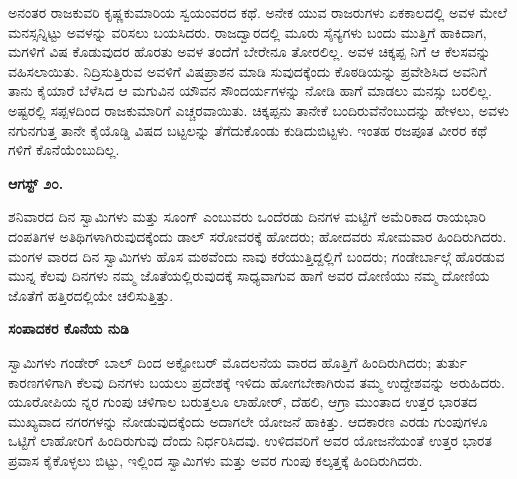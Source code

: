 ಅನಂತರ ರಾಜಕುವರಿ ಕೃಷ್ಣಕುಮಾರಿಯ ಸ್ವಯಂವರದ ಕಥೆ. ಅನೇಕ ಯುವ ರಾಜರುಗಳು ಏಕಕಾಲದಲ್ಲಿ ಅವಳ ಮೇಲೆ ಮನಸ್ಸನ್ನಿಟ್ಟು ಅವಳನ್ನು ವರಿಸಲು ಬಯಸಿದರು. ರಾಜದ್ವಾರದಲ್ಲಿ ಮೂರು ಸೈನ್ಯಗಳು ಬಂದು ಮುತ್ತಿಗೆ ಹಾಕಿದಾಗ, ಮಗಳಿಗೆ ವಿಷ ಕೊಡುವುದರ ಹೊರತು ಅವಳ ತಂದೆಗೆ ಬೇರೇನೂ ತೋರಲಿಲ್ಲ. ಅವಳ ಚಿಕ್ಕಪ್ಪ ನಿಗೆ ಆ ಕೆಲಸವನ್ನು ವಹಿಸಲಾಯಿತು. ನಿದ್ರಿಸುತ್ತಿರುವ ಅವಳಿಗೆ ವಿಷಪ್ರಾಶನ ಮಾಡಿ ಸುವುದಕ್ಕೆಂದು ಕೊಠಡಿಯನ್ನು ಪ್ರವೇಶಿಸಿದ ಅವನಿಗೆ ತಾನು ಕೈಯಾರೆ ಬೆಳೆಸಿದ ಆ ಮಗುವಿನ ಯೌವನ ಸೌಂದರ್ಯಗಳನ್ನು ನೋಡಿ ಹಾಗೆ ಮಾಡಲು ಮನಸ್ಸು ಬರಲಿಲ್ಲ. ಅಷ್ಟರಲ್ಲಿ ಸಪ್ಪಳದಿಂದ ರಾಜಕುಮಾರಿಗೆ ಎಚ್ಚರವಾಯಿತು. ಚಿಕ್ಕಪ್ಪನು ತಾನೇಕೆ ಬಂದಿರುವೆನೆಂಬುದನ್ನು ಹೇಳಲು, ಅವಳು ನಗುನಗುತ್ತ ತಾನೇ ಕೈಯೊಡ್ಡಿ ವಿಷದ ಬಟ್ಟಲನ್ನು ತೆಗೆದುಕೊಂಡು ಕುಡಿದುಬಿಟ್ಟಳು. ಇಂತಹ ರಜಪೂತ ವೀರರ ಕಥೆ ಗಳಿಗೆ ಕೊನೆಯೆಂಬುದಿಲ್ಲ.

\textbf{ಆಗಸ್ಟ್ ೨೦.}

ಶನಿವಾರದ ದಿನ ಸ್ವಾಮಿಗಳು ಮತ್ತು ಸೂಂಗ್ ಎಂಬುವರು ಒಂದೆರಡು ದಿನಗಳ ಮಟ್ಟಿಗೆ ಅಮೆರಿಕಾದ ರಾಯಭಾರಿ ದಂಪತಿಗಳ ಅತಿಥಿಗಳಾಗಿರುವುದಕ್ಕೆಂದು ಡಾಲ್ ಸರೋವರಕ್ಕೆ ಹೋದರು; ಹೋದವರು ಸೋಮವಾರ ಹಿಂದಿರುಗಿದರು. ಮಂಗಳ ವಾರದ ದಿನ ಸ್ವಾಮಿಗಳು ಹೊಸ ಮಠವೆಂದು ನಾವು ಕರೆಯುತ್ತಿದ್ದಲ್ಲಿಗೆ ಬಂದರು; ಗಂಡೇರ್ಬಾಲ್ಗೆ ಹೊರಡುವ ಮುನ್ನ ಕೆಲವು ದಿನಗಳು ನಮ್ಮ ಜೊತೆಯಲ್ಲಿರುವುದಕ್ಕೆ ಸಾಧ್ಯವಾಗುವ ಹಾಗೆ ಅವರ ದೋಣಿಯು ನಮ್ಮ ದೋಣಿಯ ಜೊತೆಗೆ ಹತ್ತಿರದಲ್ಲಿಯೇ ಚಲಿಸುತ್ತಿತ್ತು.

\begin{center}
\textbf{ಸಂಪಾದಕರ ಕೊನೆಯ ನುಡಿ}
\end{center}

ಸ್ವಾಮಿಗಳು ಗಂಡೇರ್ ಬಾಲ್ ದಿಂದ ಅಕ್ಟೋಬರ್ ಮೊದಲನೆಯ ವಾರದ ಹೊತ್ತಿಗೆ ಹಿಂದಿರುಗಿದರು; ತುರ್ತು ಕಾರಣಗಳಿಗಾಗಿ ಕೆಲವು ದಿನಗಳು ಬಯಲು ಪ್ರದೇಶಕ್ಕೆ ಇಳಿದು ಹೋಗಬೇಕಾಗಿರುವ ತಮ್ಮ ಉದ್ದೇಶವನ್ನು ಅರುಹಿದರು. ಯೂರೋಪಿಯ ನ್ನರ ಗುಂಪು ಚಳಿಗಾಲ ಬರುತ್ತಲೂ ಲಾಹೋರ್, ದೆಹಲಿ, ಆಗ್ರಾ ಮುಂತಾದ ಉತ್ತರ ಭಾರತದ ಮುಖ್ಯವಾದ ನಗರಗಳನ್ನು ನೋಡುವುದಕ್ಕೆಂದು ಅದಾಗಲೇ ಯೋಜನೆ ಹಾಕಿತ್ತು. ಆದಕಾರಣ ಎರಡು ಗುಂಪುಗಳೂ ಒಟ್ಟಿಗೆ ಲಾಹೋರಿಗೆ ಹಿಂದಿರುಗುವು ದೆಂದು ನಿರ್ಧರಿಸಿದವು. ಉಳಿದವರಿಗೆ ಅವರ ಯೋಜನೆಯಂತೆ ಉತ್ತರ ಭಾರತ ಪ್ರವಾಸ ಕೈಕೊಳ್ಳಲು ಬಿಟ್ಟು, ಇಲ್ಲಿಂದ ಸ್ವಾಮಿಗಳು ಮತ್ತು ಅವರ ಗುಂಪು ಕಲ್ಕತ್ತಕ್ಕೆ ಹಿಂದಿರುಗಿದರು.

